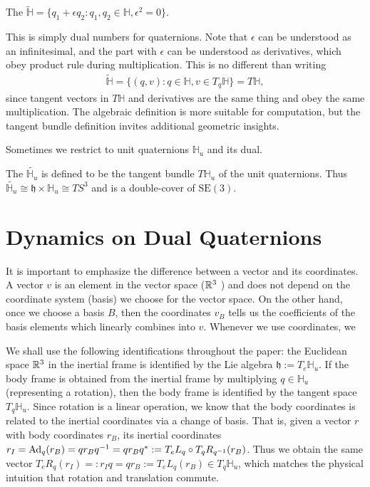 \documentclass[12pt,class=article,crop=false]{standalone}
\begin{document}
\begin{defn}
The  $ \widetilde{\mathbb{H}} = \{q_1 + \epsilon q_2: q_1, q_2 \in \mathbb{H}, \epsilon^2 = 0\}$.  
\end{defn}
This is simply dual numbers for quaternions. Note that $ \epsilon$ can be understood as an infinitesimal, and the part with $ \epsilon$ can be understood as derivatives, which obey product rule during multiplication. This is no different than writing
\begin{align*}
	\widetilde{\mathbb{H}} = \{(q, v): q \in \mathbb{H}, v \in T_q \mathbb{H}\} = T \mathbb{H}, 
\end{align*}
since tangent vectors in $ T \mathbb{H}$ and derivatives are the same thing and obey the same multiplication. The algebraic definition is more suitable for computation, but the tangent bundle definition invites additional geometric insights.

Sometimes we restrict to unit quaternions $ \mathbb{H}_u$ and its dual.
\begin{defn}
	The  $ \widetilde{\mathbb{H}_u}$ is defined to be the tangent bundle $ T \mathbb{H}_u$ of the unit quaternions. Thus $ \widetilde{\mathbb{H}_u} \cong \mathfrak{ h} \times \mathbb{H}_u \cong TS^{3}$ and is a double-cover of $ \text{SE}(3) $.
\end{defn}
\section{Dynamics on Dual Quaternions}
It is important to emphasize the difference between a vector and its coordinates. A vector $ v$ is an element in the vector space ($ \mathbb{R}^3$ ) and does not depend on the coordinate system (basis) we choose for the vector space. On the other hand, once we choose a basis $ B$, then the coordinates $ v_B$ tells us the coefficients of the basis elements which linearly combines into $ v$. Whenever we use coordinates, we 

We shall use the following identifications throughout the paper: the Euclidean space $ \mathbb{R}^{3}$ in the inertial frame is identified by the Lie algebra $ \mathfrak{ h} := T_e \mathbb{H}_u$. If the body frame is obtained from the inertial frame by multiplying $ q \in \mathbb{H}_u$ (representing a rotation), then the body frame is identified by the tangent space $ T_q \mathbb{H}_u$. Since rotation is a linear operation, we know that the body coordinates is related to the inertial coordinates via a change of basis. That is, given a vector $ r$ with body coordinates $ r_B$, its inertial coordinates $ r_I = \operatorname{Ad}_q(r_B)= q r_B q^{-1} = q r_B q^*:= T_e L_q \circ T_q R_{q^{-1}} (r_B) $. Thus we obtain the same vector $T_e R_q(r_I) =: r_I q = q r_B:= T_e L_q(r_B) \in T_q \mathbb{H}_u$, which matches the physical intuition that rotation and translation commute.
\end{document}
